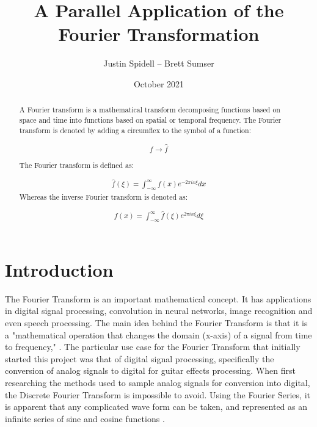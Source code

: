 \documentclass[12pt]{extarticle}
\title{A Parallel Application of the Fourier Transformation}
\author{Justin Spidell -- Brett Sumser}
\date{October 2021}
\begin{document}
 
\maketitle
\newpage
\begin{abstract}

A Fourier transform is a mathematical transform decomposing functions based on space and time into functions based on spatial or temporal frequency. The Fourier transform is denoted by adding a circumflex to the symbol of a function:

\begin{align*}
f \rightarrow \hat{f}
\end{align*}

The Fourier transform is defined as:

\begin{align}
\hat{f} (\xi)= \int^{\infty}_{-\infty}f(x) e^{-2 \pi i x \xi}dx
\end{align}
Whereas the inverse Fourier transform is denoted as:

\begin{align}
{f} (x)= \int^{\infty}_{-\infty}\hat{f}(\xi) e^{2 \pi i x \xi}d\xi
\end{align}

\end{abstract}


\maketitle
\newpage
\section*{Introduction}

    The Fourier Transform is an important mathematical concept. It has applications
    in digital signal processing, convolution in neural networks, image recognition and even speech processing.
    The main idea behind the Fourier Transform is that it is a 
    "mathematical operation that changes the domain (x-axis) of a signal from time to frequency," \cite{Maklin:2019}.
    The particular use case for the Fourier Transform that initially started this project was that of 
    digital signal processing, specifically the conversion of analog signals to digital for guitar effects processing.
    When first researching the methods used to sample analog signals for conversion into digital, the Discrete Fourier 
    Transform is impossible to avoid. Using the Fourier Series, it is apparent that any complicated wave form can be taken,
    and represented as an infinite series of sine and cosine functions \cite{Liu:2021}.
\end{document}
